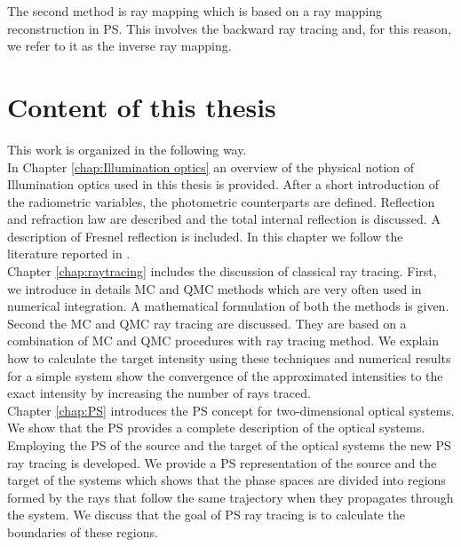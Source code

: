 The second method is ray mapping which is based on a ray mapping reconstruction in PS. This involves the backward ray tracing and, for this reason, we refer to it as the inverse ray mapping.

\section{Content of this thesis}
This work is organized in the following way.\\ \indent
In Chapter \ref{chap:Illumination optics} an overview of the physical notion of Illumination optics used in this thesis is provided. After a short introduction of the radiometric variables, the photometric counterparts are defined. Reflection and refraction law are described and the total internal reflection is discussed. A description of Fresnel reflection is included. In this chapter we follow the literature reported in \cite{hecht1998hecht, feynman2011feynman, feynman1964feynman}.\\ \indent
Chapter \ref{chap:raytracing} includes the discussion of classical ray tracing. First, we introduce in details MC and QMC methods which are very often used in numerical integration. A mathematical formulation of both the methods is given. Second the MC and QMC ray tracing are discussed. They are based on a combination of MC and QMC procedures with ray tracing method. We explain how to calculate the target intensity using these techniques and numerical results for a simple system show the convergence of the approximated intensities to the exact intensity by increasing the number of rays traced.\\\indent
Chapter \ref{chap:PS} introduces the PS concept for two-dimensional optical systems. We show that the PS provides a complete description of the optical systems. Employing the PS of the source and the target of the optical systems the new PS ray tracing is developed. We provide a PS representation of the source and the target of the systems which shows that the phase spaces are divided into regions formed by the rays that follow the same trajectory when they propagates through the system. We discuss that the goal of PS ray tracing is to calculate the boundaries of these regions. \\ \indent 
